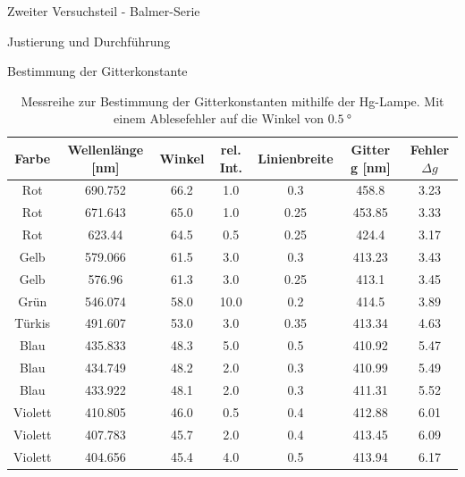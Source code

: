 \documentclass[pdftex, a4paper,11pt, twoside, ngerman]{report}
\begin{document}
\begin{chapter}{Zweiter Versuchsteil - Balmer-Serie}
\begin{section}{Justierung und Durchführung}
\begin{subsection}{Bestimmung der Gitterkonstante}
        \begin{table}[htbp]
          \centering
          \footnotesize
          \begin{tabular}{|c|c|c|c|c|c|c|}
            \hline
            Farbe & Wellenlänge [nm] & Winkel & rel. Int. & 
            Linienbreite & Gitter g [nm] & Fehler $\Delta g$ \\ 
                \hline \hline 
            Rot & 690.752 & 66.2 & 1.0 & 0.3 & 458.8 & 3.23 \\ \hline 
            Rot & 671.643 & 65.0 & 1.0 & 0.25 & 453.85 & 3.33 \\ \hline
            Rot & 623.44 & 64.5 & 0.5 & 0.25 & 424.4 & 3.17 \\ \hline
            Gelb & 579.066 & 61.5 & 3.0 & 0.3 & 413.23 & 3.43 \\ \hline
            Gelb & 576.96 & 61.3 & 3.0 & 0.25 & 413.1 & 3.45 \\ \hline 
            Grün & 546.074 & 58.0 & 10.0 & 0.2 & 414.5 & 3.89 \\ \hline
            Türkis & 491.607 & 53.0 & 3.0 & 0.35 & 413.34 & 4.63 \\ \hline
            Blau & 435.833 & 48.3 & 5.0 & 0.5 & 410.92 & 5.47 \\ \hline
            Blau & 434.749 & 48.2 & 2.0 & 0.3 & 410.99 & 5.49 \\ \hline 
            Blau & 433.922 & 48.1 & 2.0 & 0.3 & 411.31 & 5.52 \\ \hline
            Violett & 410.805 & 46.0 & 0.5 & 0.4 & 412.88 & 6.01 \\ \hline
            Violett & 407.783 & 45.7 & 2.0 & 0.4 & 413.45 & 6.09 \\ \hline
            Violett & 404.656 & 45.4 & 4.0 & 0.5 & 413.94 & 6.17 \\ \hline
          \end{tabular}
          \caption{Messreihe zur Bestimmung der Gitterkonstanten mithilfe 
              der Hg-Lampe. Mit einem Ablesefehler auf die Winkel von 
              $\SI{0.5}{\degree}$}
          \label{tab:GitterkonstanteHg}
        \end{table}

      \end{subsection}
     
     
     

\end{section}
\end{chapter}
\end{document}
